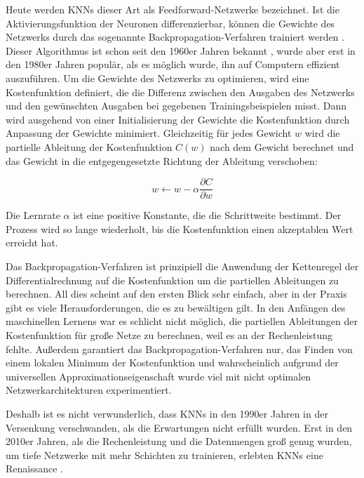 Heute werden KNNs dieser Art als Feedforward-Netzwerke bezeichnet.
Ist die Aktivierungsfunktion der Neuronen differenzierbar, können die Gewichte des Netzwerks durch das sogenannte Backpropagation-Verfahren trainiert werden \cite{Rumelhart1986}.
Dieser Algorithmus ist schon seit den 1960er Jahren bekannt \cite{Amari1967}, wurde aber erst in den 1980er Jahren populär, als es möglich wurde, ihn auf Computern effizient auszuführen.
Um die Gewichte des Netzwerks zu optimieren, wird eine Kostenfunktion definiert, die die Differenz zwischen den Ausgaben des Netzwerks und den gewünschten Ausgaben bei gegebenen Trainingsbeispielen misst.
Dann wird ausgehend von einer Initialisierung der Gewichte die Kostenfunktion durch Anpassung der Gewichte minimiert.
Gleichzeitig für jedes Gewicht $w$ wird die partielle Ableitung der Kostenfunktion $C(w)$ nach dem Gewicht berechnet und das Gewicht in die entgegengesetzte Richtung der Ableitung verschoben:

$$
w \leftarrow w - \alpha \frac{\partial C}{\partial w}
$$

Die Lernrate $\alpha$ ist eine positive Konstante, die die Schrittweite bestimmt.
Der Prozess wird so lange wiederholt, bis die Kostenfunktion einen akzeptablen Wert erreicht hat.

Das Backpropagation-Verfahren ist prinzipiell die Anwendung der Kettenregel der Differentialrechnung auf die Kostenfunktion um die partiellen Ableitungen zu berechnen.
All dies scheint auf den ersten Blick sehr einfach, aber in der Praxis gibt es viele Herausforderungen, die es zu bewältigen gilt.
In den Anfängen des maschinellen Lernens war es schlicht nicht möglich, die partiellen Ableitungen der Kostenfunktion für große Netze zu berechnen, weil es an der Rechenleistung fehlte.
Außerdem garantiert das Backpropagation-Verfahren nur, das Finden von einem lokalen Minimum der Kostenfunktion und wahrscheinlich aufgrund der universellen Approximationseigenschaft wurde viel mit nicht optimalen Netzwerkarchitekturen experimentiert.

Deshalb ist es nicht verwunderlich, dass KNNs in den 1990er Jahren in der Versenkung verschwanden, als die Erwartungen nicht erfüllt wurden.
Erst in den 2010er Jahren, als die Rechenleistung und die Datenmengen groß genug wurden, um tiefe Netzwerke mit mehr Schichten zu trainieren, erlebten KNNs eine Renaissance \cite{Schmidhuber2015}.

